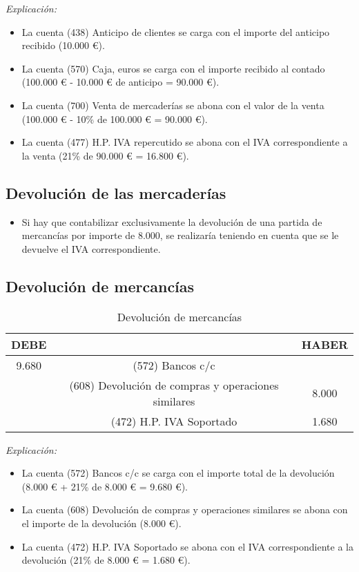 \documentclass{article}
\begin{document}
\textit{Explicación:} 
\begin{itemize}
    \item La cuenta (438) Anticipo de clientes se carga con el importe del anticipo recibido (10.000 €).
    \item La cuenta (570) Caja, euros se carga con el importe recibido al contado (100.000 € - 10.000 € de anticipo = 90.000 €).
    \item La cuenta (700) Venta de mercaderías se abona con el valor de la venta (100.000 € - 10\% de 100.000 € = 90.000 €).
    \item La cuenta (477) H.P. IVA repercutido se abona con el IVA correspondiente a la venta (21\% de 90.000 € = 16.800 €).
\end{itemize}

\subsection*{Devolución de las mercaderías}

\begin{itemize}
    \item Si hay que contabilizar exclusivamente la devolución de una partida de mercancías por importe de 8.000, se realizaría teniendo en cuenta que se le devuelve el IVA correspondiente.
\end{itemize}

\subsection*{Devolución de mercancías}

\begin{table}[H]
\centering
\begin{tabular}{|c|c|c|}
\hline
\textbf{DEBE} & & \textbf{HABER} \\
\hline
9.680 & (572) Bancos c/c & \\
 & (608) Devolución de compras y operaciones similares & 8.000 \\
 & (472) H.P. IVA Soportado & 1.680 \\
\hline
\end{tabular}
\caption{Devolución de mercancías}
\end{table}

\textit{Explicación:} 
\begin{itemize}
    \item La cuenta (572) Bancos c/c se carga con el importe total de la devolución (8.000 € + 21\% de 8.000 € = 9.680 €).
    \item La cuenta (608) Devolución de compras y operaciones similares se abona con el importe de la devolución (8.000 €).
    \item La cuenta (472) H.P. IVA Soportado se abona con el IVA correspondiente a la devolución (21\% de 8.000 € = 1.680 €).
\end{itemize}
\end{document}
